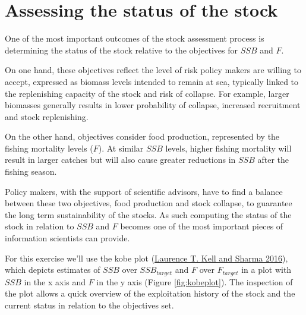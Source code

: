 \documentclass[
]{book}
\begin{document}
\hypertarget{assessing-the-status-of-the-stock}{%
\section{Assessing the status of the stock}\label{assessing-the-status-of-the-stock}}

One of the most important outcomes of the stock assessment process is determining the status of the stock relative to the objectives for \(SSB\) and \(F\).

On one hand, these objectives reflect the level of risk policy makers are willing to accept, expressed as biomass levels intended to remain at sea, typically linked to the replenishing capacity of the stock and risk of collapse. For example, larger biomasses generally results in lower probability of collapse, increased recruitment and stock replenishing.

On the other hand, objectives consider food production, represented by the fishing mortality levels (\(F\)). At similar \(SSB\) levels, higher fishing mortality will result in larger catches but will also cause greater reductions in \(SSB\) after the fishing season.

Policy makers, with the support of scientific advisors, have to find a balance between these two objectives, food production and stock collapse, to guarantee the long term sustainability of the stocks. As such computing the status of the stock in relation to \(SSB\) and \(F\) becomes one of the most important pieces of information scientists can provide.

For this exercise we'll use the kobe plot (\protect\hyperlink{ref-kell2016quantification}{Laurence T. Kell and Sharma 2016}), which depicts estimates of \(SSB\) over \(SSB_{target}\) and \(F\) over \(F_{target}\) in a plot with \(SSB\) in the x axis and \(F\) in the y axis (Figure \ref{fig:kobeplot}). The inspection of the plot allows a quick overview of the exploitation history of the stock and the current status in relation to the objectives set.
\end{document}
